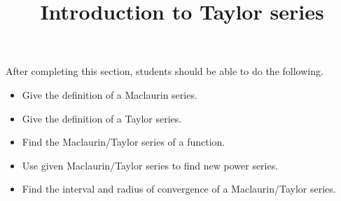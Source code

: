 \documentclass{ximera}
\title{Introduction to Taylor series}
\begin{document}
\begin{abstract}
\end{abstract}

\maketitle

\begin{sectionOutcomes}

After completing this section, students should be able to do the following.

\begin{itemize}
\item Give the definition of a Maclaurin series.
\item Give the definition of a Taylor series.
\item Find the Maclaurin/Taylor series of a function.
\item Use given Maclaurin/Taylor series to find new power series.
\item Find the interval and radius of convergence of a Maclaurin/Taylor series.
\end{itemize}

\end{sectionOutcomes}
\end{document}
